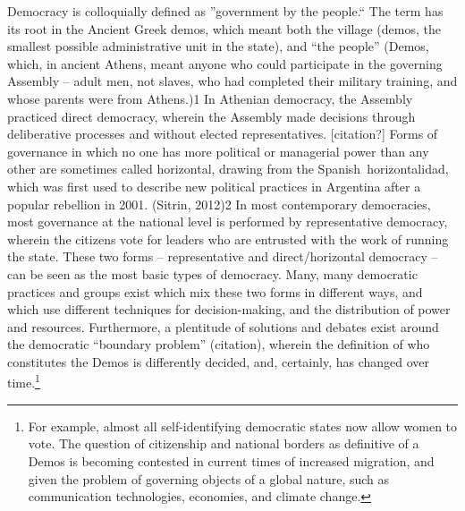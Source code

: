 Democracy is colloquially defined as ''government by the people.`` The term has
its root in the Ancient Greek demos, which meant both the village (demos, the
smallest possible administrative unit in the state), and ``the people'' (Demos,
which, in ancient Athens, meant anyone who could participate in the governing
Assembly -- adult men, not slaves, who had completed their military training,
and whose parents were from Athens.)1 In Athenian democracy, the Assembly
practiced direct democracy, wherein the Assembly made decisions through
deliberative processes and without elected representatives. [citation?] Forms of
governance in which no one has more political or managerial power than any other
are sometimes called horizontal, drawing from the Spanish horizontalidad, which
was first used to describe new political practices in Argentina after a popular
rebellion in 2001. (Sitrin, 2012)2 In most contemporary democracies, most
governance at the national level is performed by representative democracy,
wherein the citizens vote for leaders who are entrusted with the work of running
the state. These two forms – representative and direct/horizontal democracy --
can be seen as the most basic types of democracy. Many, many democratic
practices and groups exist which mix these two forms in different ways, and
which use different techniques for decision-making, and the distribution of
power and resources. Furthermore, a plentitude of solutions and debates exist
around the democratic “boundary problem” (citation), wherein the definition of
who constitutes the Demos is differently decided, and, certainly, has changed
over time.\footnote{For example, almost all self-identifying democratic states
now allow women to vote. The question of citizenship and national borders as
definitive of a Demos is becoming contested in current times of increased
migration, and given the problem of governing objects of a global nature, such
as communication technologies, economies, and climate change.}

